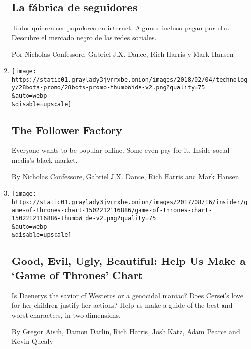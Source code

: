 \begin{enumerate}
  \hypertarget{la-fuxe1brica-de-seguidores}{%
  \subsection{La fábrica de
  seguidores}\label{la-fuxe1brica-de-seguidores}}

  Todos quieren ser populares en internet. Algunos incluso pagan por
  ello. Descubre el mercado negro de las redes sociales.

  Por Nicholas Confessore, Gabriel J.X. Dance, Rich Harris y Mark Hansen
\item
  \href{/interactive/2018/01/27/technology/social-media-bots.html}{}

  \texttt{[image: https://static01.graylady3jvrrxbe.onion/images/2018/02/04/technology/28bots-promo/28bots-promo-thumbWide-v2.png?quality=75\\\&auto=webp\\\&disable=upscale]}

  \hypertarget{the-follower-factory}{%
  \subsection{The Follower Factory}\label{the-follower-factory}}

  Everyone wants to be popular online. Some even pay for it. Inside
  social media's black market.

  By Nicholas Confessore, Gabriel J.X. Dance, Rich Harris and Mark
  Hansen
\item
  \href{/interactive/2017/08/09/upshot/game-of-thrones-chart.html}{}

  \texttt{[image: https://static01.graylady3jvrrxbe.onion/images/2017/08/16/insider/game-of-thrones-chart-1502212116886/game-of-thrones-chart-1502212116886-thumbWide-v2.png?quality=75\\\&auto=webp\\\&disable=upscale]}

  \hypertarget{good-evil-ugly-beautiful-help-us-make-a-game-of-thrones-chart}{%
  \subsection{Good, Evil, Ugly, Beautiful: Help Us Make a `Game of
  Thrones'
  Chart}\label{good-evil-ugly-beautiful-help-us-make-a-game-of-thrones-chart}}

  Is Daenerys the savior of Westeros or a genocidal maniac? Does
  Cersei's love for her children justify her actions? Help us make a
  guide of the best and worst characters, in two dimensions.

  By Gregor Aisch, Damon Darlin, Rich Harris, Josh Katz, Adam Pearce and
  Kevin Quealy
\end{enumerate}

